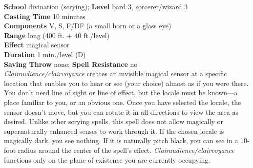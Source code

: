 \textbf{School} divination (scrying); \textbf{Level} bard 3, sorcerer/wizard 3\\
\textbf{Casting Time} 10 minutes\\
\textbf{Components} V, S, F/DF (a small horn or a glass eye)\\
\textbf{Range} long (400 ft. + 40 ft./level)\\
\textbf{Effect }magical sensor\\
\textbf{Duration} 1 min./level (D)\\
\textbf{Saving Throw} none; \textbf{Spell Resistance} no\\
\textit{Clairaudience/clairvoyance }creates an invisible magical sensor at a specific location that enables you to hear or see (your choice) almost as if you were there. You don't need line of sight or line of effect, but the locale must be known---a place familiar to you, or an obvious one. Once you have selected the locale, the sensor doesn't move, but you can rotate it in all directions to view the area as desired. Unlike other scrying spells, this spell does not allow magically or supernaturally enhanced senses to work through it. If the chosen locale is magically dark, you see nothing. If it is naturally pitch black, you can see in a 10-foot radius around the center of the spell's effect. \textit{Clairaudience/clairvoyance }functions only on the plane of existence you are currently occupying.\\
